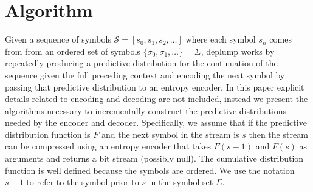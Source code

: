 \section{Algorithm}
\newcommand{\T}{\ensuremath{\mathcal{T}}}
\newcommand{\N}{\ensuremath{\mathcal{N}}}
\newcommand{\M}{\ensuremath{\mathcal{M}}}
\newcommand{\PP}{\ensuremath{\mathcal{P}}}
\newcommand{\nc}{\ensuremath{nc}}
\newcommand{\RS}{\ensuremath{\mathcal{R}\mathcal{S}}}
\newcommand{\D}{\ensuremath{\mathcal{D}}}
\newcommand{\la}{\ensuremath{\leftarrow}}
\newcommand{\G}{\ensuremath{\mathcal{G}}}
\newcommand{\IS}{\ensuremath{\mathcal{I}\mathcal{S}}}
\newcommand{\Seq}{\ensuremath{\mathcal{S}}}
\newcommand{\dd}{\ensuremath{\delta}}
%
%
Given a sequence of symbols $\Seq = [s_0, s_1, s_2, \ldots]$ where each symbol $s_n$ comes from from an ordered set of symbols $\{\sigma_0, \sigma_1, \ldots\} = \Sigma$,  deplump works by repeatedly producing a predictive distribution for the continuation of the sequence given the full preceding context and encoding the next symbol by passing that predictive distribution to an entropy encoder.  In this paper explicit details related to encoding and decoding are not included, instead we present the algorithms necessary to incrementally construct the predictive distributions needed by the encoder and decoder.  Specifically, we assume that if the predictive distribution function is $F$ and the next symbol in the stream is $s$ then the stream can be compressed using an entropy encoder that takes $F(s-1)$ and $F(s)$ as arguments and returns a bit stream (possibly null)\citep{Witten1987,arithmeticencoding}.   The cumulative distribution function is well defined because the symbols are ordered. We use the notation $s-1$ to refer to the symbol prior to $s$ in the symbol set $\Sigma$.  %

